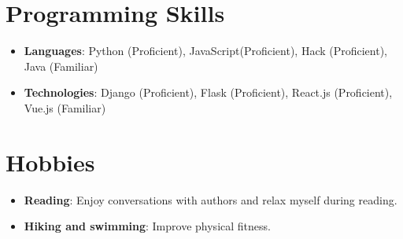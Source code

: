 \documentclass[letterpaper,11pt]{article}
\newcommand{\resumeItem}[2]{
  \item\small{
    \textbf{#1}{: #2 \vspace{-2pt}}
  }
}
\newcommand{\resumeSubItem}[2]{\resumeItem{#1}{#2}\vspace{-4pt}}
\newcommand{\resumeSubHeadingListStart}{\begin{itemize}[leftmargin=*]}
\newcommand{\resumeSubHeadingListEnd}{\end{itemize}}
\begin{document}
\section{Programming Skills}
  \resumeSubHeadingListStart
    \resumeSubItem{Languages}
    {Python (Proficient), JavaScript(Proficient), Hack (Proficient), Java (Familiar)}
    \resumeSubItem{Technologies}
    {Django (Proficient), Flask (Proficient), React.js (Proficient), Vue.js (Familiar)}
 \resumeSubHeadingListEnd

\section{Hobbies}
  \resumeSubHeadingListStart
    \resumeSubItem{Reading}
    {Enjoy conversations with authors and relax myself during reading.}
    \resumeSubItem{Hiking and swimming} 
    {Improve physical fitness. }
 \resumeSubHeadingListEnd


\end{document}
